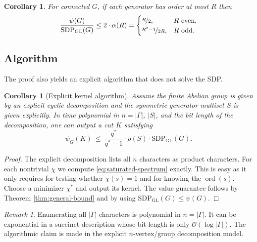 \documentclass[11pt]{article}
\newtheorem{corollary}[theorem]{Corollary}
\theoremstyle{definition}
\theoremstyle{remark}
\newtheorem{remark}[theorem]{Remark}
\newcommand{\ord}{\operatorname{ord}}
\newcommand{\gl}{\operatorname{SDP_{GL}}}
\begin{document}
\begin{corollary}\label{cor:bounded-order}
For connected $G$, if each generator has order at most $R$ then
\[
  \frac{\psi(G)}{\gl(G)}\leq 2 \cdot \alpha(R)
  =
  \begin{cases}
    \nicefrac{R}{2},&R\text{ even}, \\
    \nicefrac{R^2-1}{2R},&R\text{ odd}.
  \end{cases}
\]
\end{corollary}


\subsection{Algorithm}

The proof also yields an explicit algorithm that does not solve the SDP.


\begin{corollary}[Explicit kernel algorithm]\label{cor:kernel-algorithm}
Assume the finite Abelian group is given by an explicit cyclic decomposition and the symmetric generator multiset $S$ is given explicitly. In time polynomial in $n=|\Gamma|$, $|S|$, and the bit length of the decomposition, one can output a cut $K$ satisfying
\[
  \psi_G(K)
  ~\leq~ \frac{q^*}{q^*-1} \cdot \rho(S) \cdot \gl(G).
\]
\end{corollary}

\begin{proof}
The explicit decomposition lists all $n$ characters as product characters. For each nontrivial $\chi$ we compute \eqref{eq:saturated-spectrum} exactly. This is easy as it only requires for testing whether $\chi(s)=1$ and for knowing the $\ord(s)$. Choose a minimizer $\chi^*$ and output its kernel. The value guarantee follows by Theorem \ref{thm:general-bound} and by using $\gl(G) \leq \psi(G)$.
\end{proof}

\begin{remark}
Enumerating all $|\Gamma|$ characters is polynomial in $n=|\Gamma|$. It can be exponential in a succinct description whose bit length is only $\mathcal{O}(\log|\Gamma|)$. The algorithmic claim is made in the explicit $n$-vertex/group decomposition model.
\end{remark}
\end{document}
